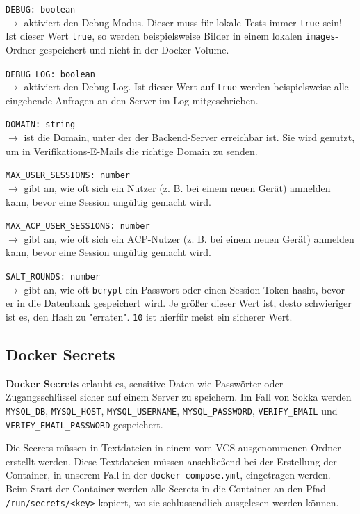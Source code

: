 \lstinline{DEBUG: boolean} \\
$\rightarrow$ aktiviert den Debug-Modus. Dieser muss für lokale Tests immer \lstinline{true} sein! Ist dieser Wert \lstinline{true}, so werden beispielsweise Bilder in einem lokalen \lstinline{images}-Ordner gespeichert und nicht in der Docker Volume.

\lstinline{DEBUG_LOG: boolean} \\
$\rightarrow$ aktiviert den Debug-Log. Ist dieser Wert auf \lstinline{true} werden beispielsweise alle eingehende Anfragen an den Server im Log mitgeschrieben.

\lstinline{DOMAIN: string} \\
$\rightarrow$ ist die Domain, unter der der Backend-Server erreichbar ist. Sie wird genutzt, um in Verifikations-E-Mails die richtige Domain zu senden.

\newpage

\lstinline{MAX_USER_SESSIONS: number} \\
$\rightarrow$ gibt an, wie oft sich ein Nutzer (z. B. bei einem neuen Gerät) anmelden kann, bevor eine Session ungültig gemacht wird.

\lstinline{MAX_ACP_USER_SESSIONS: number} \\
$\rightarrow$ gibt an, wie oft sich ein ACP-Nutzer (z. B. bei einem neuen Gerät) anmelden kann, bevor eine Session ungültig gemacht wird.

\lstinline{SALT_ROUNDS: number} \\
$\rightarrow$ gibt an, wie oft \lstinline{bcrypt} ein Passwort oder einen Session-Token hasht, bevor er in die Datenbank gespeichert wird. Je größer dieser Wert ist, desto schwieriger ist es, den Hash zu "erraten". \lstinline{10} ist hierfür meist ein sicherer Wert. \cite{stoeckli2017}

\subsection{Docker Secrets}
\label{dockersecrets}

\textbf{Docker Secrets} erlaubt es, sensitive Daten wie Passwörter oder Zugangsschlüssel sicher auf einem Server zu speichern. Im Fall von Sokka werden \lstinline{MYSQL_DB}, \lstinline{MYSQL_HOST}, \lstinline{MYSQL_USERNAME}, \lstinline{MYSQL_PASSWORD}, \lstinline{VERIFY_EMAIL} und \lstinline{VERIFY_EMAIL_PASSWORD} gespeichert.

Die Secrets müssen in Textdateien in einem vom VCS ausgenommenen Ordner erstellt werden. Diese Textdateien müssen anschließend bei der Erstellung der Container, in unserem Fall in der \lstinline{docker-compose.yml}, eingetragen werden. Beim Start der Container werden alle Secrets in die Container an den Pfad \lstinline{/run/secrets/<key>} kopiert, wo sie schlussendlich ausgelesen werden können.

